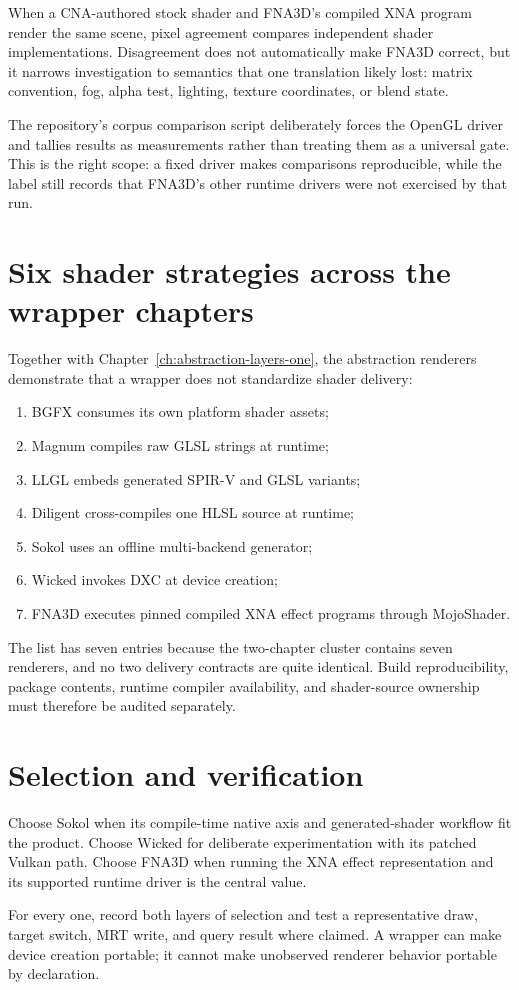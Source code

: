 When a CNA-authored stock shader and FNA3D's compiled XNA program render the same scene, pixel
agreement compares independent shader implementations.  Disagreement does not automatically
make FNA3D correct, but it narrows investigation to semantics that one translation likely
lost: matrix convention, fog, alpha test, lighting, texture coordinates, or blend state.

The repository's corpus comparison script deliberately forces the OpenGL driver and tallies
results as measurements rather than treating them as a universal gate.  This is the right
scope: a fixed driver makes comparisons reproducible, while the label still records that
FNA3D's other runtime drivers were not exercised by that run.

\section{Six shader strategies across the wrapper chapters}

Together with Chapter~\ref{ch:abstraction-layers-one}, the abstraction renderers demonstrate
that a wrapper does not standardize shader delivery:

\begin{enumerate}
  \item BGFX consumes its own platform shader assets;
  \item Magnum compiles raw GLSL strings at runtime;
  \item LLGL embeds generated SPIR-V and GLSL variants;
  \item Diligent cross-compiles one HLSL source at runtime;
  \item Sokol uses an offline multi-backend generator;
  \item Wicked invokes DXC at device creation;
  \item FNA3D executes pinned compiled XNA effect programs through MojoShader.
\end{enumerate}

The list has seven entries because the two-chapter cluster contains seven renderers, and no
two delivery contracts are quite identical.  Build reproducibility, package contents, runtime
compiler availability, and shader-source ownership must therefore be audited separately.

\section{Selection and verification}

Choose Sokol when its compile-time native axis and generated-shader workflow fit the product.
Choose Wicked for deliberate experimentation with its patched Vulkan path.  Choose FNA3D when
running the XNA effect representation and its supported runtime driver is the central value.

For every one, record both layers of selection and test a representative draw, target switch,
MRT write, and query result where claimed.  A wrapper can make device creation portable; it
cannot make unobserved renderer behavior portable by declaration.
